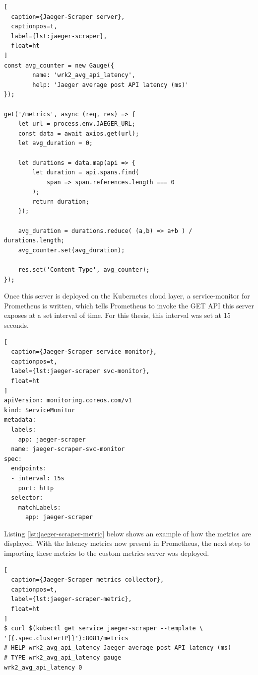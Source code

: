 \begin{lstlisting}[
  caption={Jaeger-Scraper server},
  captionpos=t,
  label={lst:jaeger-scraper},
  float=ht
]
const avg_counter = new Gauge({
        name: 'wrk2_avg_api_latency',
        help: 'Jaeger average post API latency (ms)'
});

get('/metrics', async (req, res) => {
    let url = process.env.JAEGER_URL;
    const data = await axios.get(url);
    let avg_duration = 0;

    let durations = data.map(api => {
        let duration = api.spans.find(
            span => span.references.length === 0
        );
        return duration;
    });

    avg_duration = durations.reduce( (a,b) => a+b ) / durations.length;
    avg_counter.set(avg_duration);

    res.set('Content-Type', avg_counter);
});
\end{lstlisting}

Once this server is deployed on the Kubernetes cloud layer, a service-monitor for Prometheus is written, which tells Prometheus to invoke the GET API this server exposes at a set interval of time. For this thesis, this interval was set at 15 seconds.

\begin{lstlisting}[
  caption={Jaeger-Scraper service monitor},
  captionpos=t,
  label={lst:jaeger-scraper svc-monitor},
  float=ht
]
apiVersion: monitoring.coreos.com/v1
kind: ServiceMonitor
metadata:
  labels:
    app: jaeger-scraper
  name: jaeger-scraper-svc-monitor
spec:
  endpoints:
  - interval: 15s
    port: http
  selector:
    matchLabels:
      app: jaeger-scraper
\end{lstlisting}

Listing \ref{lst:jaeger-scraper-metric} below shows an example of how the metrics are displayed. With the latency metrics now present in Prometheus, the next step to importing these metrics to the custom metrics server was deployed.\par

\begin{lstlisting}[
  caption={Jaeger-Scraper metrics collector},
  captionpos=t,
  label={lst:jaeger-scraper-metric},
  float=ht
]
$ curl $(kubectl get service jaeger-scraper --template \
'{{.spec.clusterIP}}'):8081/metrics
# HELP wrk2_avg_api_latency Jaeger average post API latency (ms)
# TYPE wrk2_avg_api_latency gauge
wrk2_avg_api_latency 0
\end{lstlisting}

